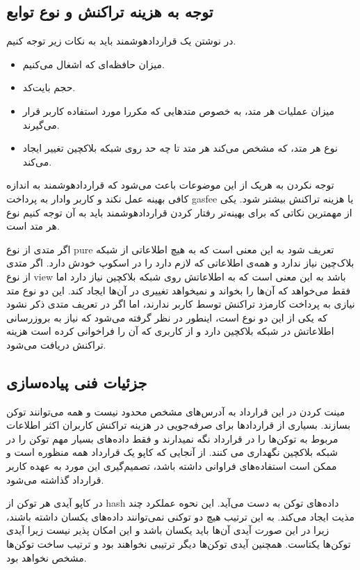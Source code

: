 \subsection{توجه به هزینه تراکنش و نوع توابع}
در نوشتن یک قراردادهوشمند باید به نکات زیر توجه کنیم.
\begin{itemize}
  \item
میزان حافظه‌ای که اشغال می‌کنیم.
  \item
حجم بایت‌کد.
  \item
میزان عملیات هر متد، به خصوص متدهایی که مکررا مورد استفاده کاربر قرار می‌گیرند.
  \item
نوع هر متد، که مشخص می‌کند هر متد تا چه حد روی شبکه بلاکچین تغییر ایجاد می‌کند.
\end{itemize}

توجه نکردن به هریک از این موضوعات باعث می‌شود که قراردادهوشمند به اندازه کافی بهینه عمل نکند و کاربر وادار به پرداخت gasfee یا هزینه تراکنش بیشتر شود. یکی از مهمترین نکاتی که برای بهینه‌تر رفتار کردن قراردادهوشمند باید به آن توجه کنیم نوع هر متد است.

اگر متدی از نوع pure تعریف شود به این معنی است که به هیچ اطلاعاتی از شبکه بلاک‌چین نیاز ندارد و همه‌ی اطلاعاتی که لازم دارد را در اسکوپ
خودش دارد. اگر متدی از نوع view باشد به این معنی است که به اطلاعاتش روی شبکه بلاکچین نیاز دارد اما فقط می‌خواهد که آن‌ها را بخواند و نمیخواهد تغییری در آن‌ها ایجاد کند. این دو نوع متد نیازی به پرداخت کارمزد تراکنش توسط کاربر ندارند، اما اگر در تعریف متدی ذکر نشود که یکی از این دو نوع است، اینطور در نظر گرفته می‌شود که نیاز به بروزرسانی اطلاعاتش در شبکه بلاکچین دارد و از کاربری که آن را فراخوانی کرده است هزینه تراکنش دریافت می‌شود.


\subsection{جزئیات فنی پیاده‌سازی}
مینت کردن در این قرارداد به آدرس‌های مشخص محدود نیست و همه می‌توانند توکن بسازند. بسیاری از قراردادها برای صرفه‌جویی در هزینه تراکنش کاربران اکثر اطلاعات مربوط به توکن‌ها را در قرارداد نگه نمیدارند و فقط داده‌های بسیار مهم توکن را در شبکه بلاکچین نگهداری می کنند. از آنجایی که کاپو یک قرارداد همه منظوره است و ممکن است استفاده‌های فراوانی داشته باشد، تصمیم‌گیری این مورد به عهده کاربر قرارداد گذاشته می‌شود.

در کاپو آیدی هر توکن از hash داده‌های توکن به دست می‌آید. این نحوه عملکرد چند مذیت ایجاد می‌کند. به این ترتیب هیچ دو توکنی نمی‌توانند داده‌های یکسان داشته باشند، زیرا در این صورت آیدی آن‌ها باید یکسان باشد و این امکان پذیر نیست زیرا آیدی توکن‌ها یکتاست. همچنین آیدی توکن‌ها دیگر ترتیبی نخواهند بود و ترتیب ساخت توکن‌ها مشخص نخواهد بود.

